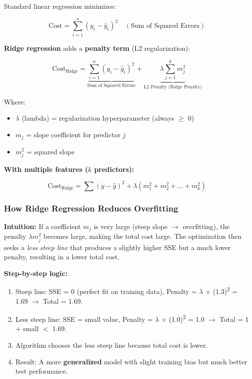 \documentclass[12pt,openany]{book}
\begin{document}
Standard linear regression minimizes:

\[
\text{Cost} = \sum_{i=1}^{n}(y_i - \hat{y}_i)^2 \quad (\text{Sum of Squared Errors})
\]


\textbf{Ridge regression} adds a \textbf{penalty term} (L2 regularization):

\[
\text{Cost}_{\text{Ridge}} = \underbrace{\sum_{i=1}^{n}(y_i - \hat{y}_i)^2}_{\text{Sum of Squared Errors}} + \underbrace{\lambda \sum_{j=1}^{k} m_j^2}_{\text{L2 Penalty (Ridge Penalty)}}
\]


Where:
\begin{itemize}[leftmargin=*]
    \item \(\lambda\) (lambda) = regularization hyperparameter (always \(\geq\) 0)
    \item \(m_j\) = slope coefficient for predictor \(j\)
    \item \(m_j^2\) = squared slope

\end{itemize}

\textbf{With multiple features (\(k\) predictors):}

\[
\text{Cost}_{\text{Ridge}} = \sum(y - \hat{y})^2 + \lambda(m_1^2 + m_2^2 + \dots + m_k^2)
\]


\subsubsection{How Ridge Regression Reduces Overfitting}


\textbf{Intuition:} If a coefficient \(m_j\) is very large (steep slope \(\rightarrow\) overfitting), the penalty \(\lambda m_j^2\) becomes large, making the total cost large. The optimization then seeks a \textit{less steep line} that produces a slightly higher SSE but a much lower penalty, resulting in a lower total cost.

\textbf{Step-by-step logic:}
\begin{enumerate}[leftmargin=*]
    \item Steep line: SSE = 0 (perfect fit on training data), Penalty = \(\lambda\) \(\times\) (1.3)\textsuperscript{2} = 1.69 \(\rightarrow\) Total = 1.69.
    \item Less steep line: SSE = small value, Penalty = \(\lambda\) \(\times\) (1.0)\textsuperscript{2} = 1.0 \(\rightarrow\) Total = 1 + small \(<\) 1.69.
    \item Algorithm chooses the less steep line because total cost is lower.
    \item Result: A more \textbf{generalized} model with slight training bias but much better test performance.

\end{enumerate}
\end{document}

